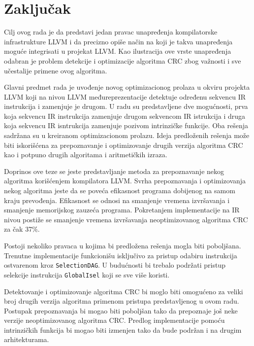 \documentclass[12pt,oneside]{memoir}
\begin{document}
\chapter{Zaključak}
\label{chap:zakljucak}
Cilj ovog rada je da predstavi jedan pravac unapređenja kompilatorske infrastrukture LLVM i da precizno opiše način na koji je takva unapređenja moguće integrisati u projekat LLVM. Kao ilustracija ove vrste unapređenja odabran je problem detekcije i optimizacije algoritma CRC zbog važnosti i sve učestalije primene ovog algoritma. 

Glavni predmet rada je uvođenje novog optimizacionog prolaza u okviru projekta LLVM koji na nivou LLVM međureprezentacije detektuje određenu sekvencu IR instrukcija i zamenjuje je drugom. U radu su predstavljene dve mogućnosti, prva koja sekvencu IR instrukcija zamenjuje drugom sekvencom IR istrukcija i druga koja sekvencu IR isntrukcija zamenjuje pozivom intrinzičke funkcije. Oba rešenja sadržana su u kreiranom optimizacionom prolazu. Ideja predloženih rešenja može biti iskorišćena za prepoznavanje i optimizovanje drugih verzija algoritma CRC kao i potpuno drugih algoritama i aritmetičkih izraza. 

Doprinos ove teze se jeste predstavljanje metoda za prepoznavanje nekog algoritma korišćenjem kompilatora LLVM. Svrha prepoznavanja i optimizovanja nekog algoritma jeste da se poveća efikasnost programa dobijenog na samom kraju prevođenja. Efikasnost se odnosi na smanjenje vremena izvršavanja i smanjenje memorijskog zauzeća programa. Pokretanjem implementacije na IR nivou postiže se smanjenje vremena izvršavanja neoptimizovanog algoritma CRC za čak 37\%. 

Postoji nekoliko pravaca u kojima bi predložena rešenja mogla biti poboljšana.
Trenutne implementacije funkcionišu isključivo za pristup odabiru instrukcija ostvarenom kroz \texttt{SelectionDAG}. U budućnosti bi trebalo podržati pristup selekcije instrukcija \texttt{GlobalIsel} koji se sve više koristi. 

Detektovanje i optimizovanje algoritma CRC bi moglo biti omogućeno za veliki broj drugih verzija algoritma primenom pristupa predstavljenog u ovom radu. Postupak prepoznavanja bi mogao biti poboljšan tako da prepoznaje još neke verzije neoptimizovanog algoritma CRC. Predlog implementacije pomoću intrinzičkih funkcija bi mogao biti izmenjen tako da bude podržan i na drugim arhitekturama.
\end{document}
